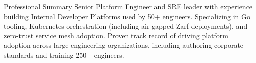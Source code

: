 \documentclass[
	a4paper, %
	10pt, %
]{resume} %
\begin{document}
\begin{rSection}{Professional Summary}
	Senior Platform Engineer and SRE leader with experience building Internal Developer Platforms used by 50+ engineers. Specializing in Go tooling, Kubernetes orchestration (including air-gapped Zarf deployments), and zero-trust service mesh adoption. Proven track record of driving platform adoption across large engineering organizations, including authoring corporate standards and training 250+ engineers.
\end{rSection}

\end{document}
